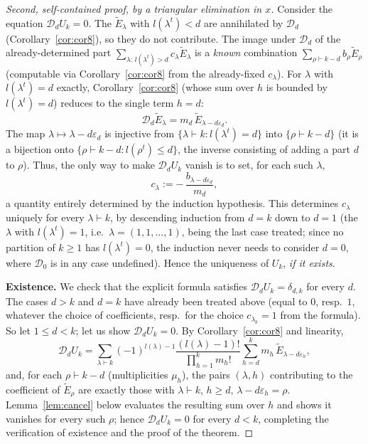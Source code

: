 \documentclass[11pt]{article}
\theoremstyle{remark}
\begin{document}
\begin{proof}[Second, self-contained proof, by a triangular elimination in $x$]
Consider the equation $\mathcal D_dU_k=0$. The $\widetilde E_\lambda$ with $l(\lambda^t)<d$ are annihilated by $\mathcal D_d$ (Corollary~\ref{cor:cor8}), so they do not contribute. The image under $\mathcal D_d$ of the already-determined part $\sum_{\lambda:\,l(\lambda^t)>d}c_\lambda\widetilde E_\lambda$ is a \emph{known} combination $\sum_{\rho\vdash k-d}b_\rho\widetilde E_\rho$ (computable via Corollary~\ref{cor:cor8} from the already-fixed $c_\lambda$). For $\lambda$ with $l(\lambda^t)=d$ exactly, Corollary~\ref{cor:cor8} (whose sum over $h$ is bounded by $l(\lambda^t)=d$) reduces to the single term $h=d$:
\[
\mathcal D_d\widetilde E_\lambda = m_d\,\widetilde E_{\lambda-d\varepsilon_d}.
\]
The map $\lambda\mapsto\lambda-d\varepsilon_d$ is injective from $\{\lambda\vdash k: l(\lambda^t)=d\}$ into $\{\rho\vdash k-d\}$ (it is a bijection onto $\{\rho\vdash k-d: l(\rho^t)\le d\}$, the inverse consisting of adding a part $d$ to $\rho$). Thus, the only way to make $\mathcal D_dU_k$ vanish is to set, for each such $\lambda$,
\[
c_\lambda := -\,\frac{b_{\lambda-d\varepsilon_d}}{m_d},
\]
a quantity entirely determined by the induction hypothesis. This determines $c_\lambda$ uniquely for every $\lambda\vdash k$, by descending induction from $d=k$ down to $d=1$ (the $\lambda$ with $l(\lambda^t)=1$, i.e.\ $\lambda=(1,1,\dots,1)$, being the last case treated; since no partition of $k\ge1$ has $l(\lambda^t)=0$, the induction never needs to consider $d=0$, where $\mathcal D_0$ is in any case undefined). Hence the uniqueness of $U_k$, \emph{if it exists}.

\smallskip
\noindent\textbf{Existence.} We check that the explicit formula satisfies $\mathcal D_dU_k=\delta_{d,k}$ for every $d$. The cases $d>k$ and $d=k$ have already been treated above (equal to $0$, resp.\ $1$, whatever the choice of coefficients, resp.\ for the choice $c_{\lambda_k}=1$ from the formula). So let $1\le d<k$; let us show $\mathcal D_dU_k=0$. By Corollary~\ref{cor:cor8} and linearity,
\[
\mathcal D_dU_k = \sum_{\lambda\vdash k}(-1)^{l(\lambda)-1}\frac{(l(\lambda)-1)!}{\prod_{h=1}^k m_h!}\sum_{h=d}^{k}m_h\,\widetilde E_{\lambda-d\varepsilon_h},
\]
and, for each $\rho\vdash k-d$ (multiplicities $\mu_h$), the pairs $(\lambda,h)$ contributing to the coefficient of $\widetilde E_\rho$ are exactly those with $\lambda\vdash k$, $h\ge d$, $\lambda-d\varepsilon_h=\rho$. Lemma~\ref{lem:cancel} below evaluates the resulting sum over $h$ and shows it vanishes for every such $\rho$; hence $\mathcal D_dU_k=0$ for every $d<k$, completing the verification of existence and the proof of the theorem.
\end{proof}
\end{document}
